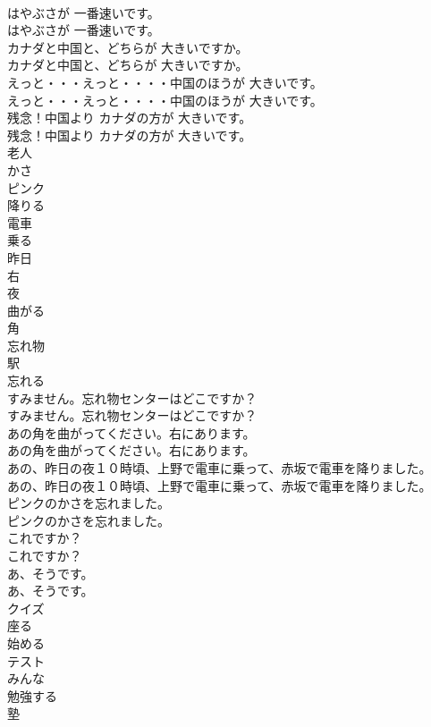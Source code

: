 \documentclass[8pt]{extreport}
\begin{document}
\begin{CJK}{UTF8}{min}
\\	はやぶさが 一番速いです。	
\\	はやぶさが 一番速いです。 
\\	カナダと中国と、どちらが 大きいですか。	
\\	カナダと中国と、どちらが 大きいですか。 
\\	えっと・・・えっと・・・・中国のほうが 大きいです。	
\\	えっと・・・えっと・・・・中国のほうが 大きいです。 
\\	残念！中国より カナダの方が 大きいです。	
\\	残念！中国より カナダの方が 大きいです。 
\\	老人
\\	かさ
\\	ピンク
\\	降りる
\\	電車
\\	乗る
\\	昨日
\\	右
\\	夜
\\	曲がる
\\	角
\\	忘れ物
\\	駅
\\	忘れる
\\	すみません。忘れ物センターはどこですか？	
\\	すみません。忘れ物センターはどこですか？ 
\\	あの角を曲がってください。右にあります。	
\\	あの角を曲がってください。右にあります。 
\\	あの、昨日の夜１０時頃、上野で電車に乗って、赤坂で電車を降りました。	
\\	あの、昨日の夜１０時頃、上野で電車に乗って、赤坂で電車を降りました。 
\\	ピンクのかさを忘れました。	
\\	ピンクのかさを忘れました。 
\\	これですか？	
\\	これですか？ 
\\	あ、そうです。	
\\	あ、そうです。 
\\	クイズ
\\	座る
\\	始める
\\	テスト
\\	みんな
\\	勉強する
\\	塾

\end{CJK}
\end{document}
